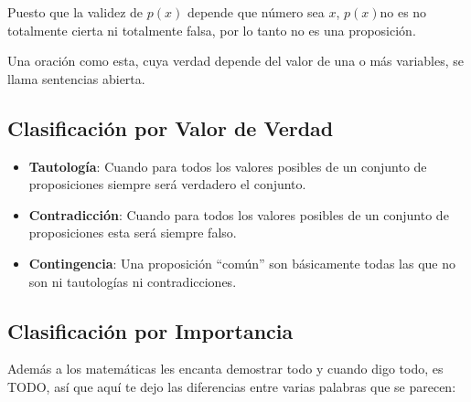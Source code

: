 \documentclass[12pt, fleqn]{report}                             %
\theoremstyle{break}                                            %
\begin{document}
                Puesto que la validez de $p(x)$ depende que número sea $x$, $p(x)$no es no
                totalmente cierta ni totalmente falsa, por lo tanto no es una proposición.

                Una oración como esta, cuya verdad depende del valor de una o más variables,
                se llama sentencias abierta.



            \subsection{Clasificación por Valor de Verdad}

                \begin{itemize}
                    \item \textbf{Tautología}: Cuando para todos los valores posibles de un conjunto
                            de proposiciones siempre será verdadero el conjunto.

                    \item \textbf{Contradicción}: Cuando para todos los valores posibles de un conjunto
                    de proposiciones esta será siempre falso.

                    \item \textbf{Contingencia}: Una proposición “común” son básicamente todas las que
                    no son ni tautologías ni contradicciones.
                \end{itemize}

            \subsection{Clasificación por Importancia}

                Además a los matemáticas les encanta demostrar todo y cuando digo todo, es TODO, así que
                aquí te dejo las diferencias entre varias palabras que se parecen:
\end{document}
